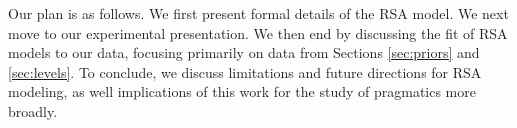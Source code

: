 Our plan is as follows. We first present formal details of the RSA model. We next move to our experimental presentation. We then end by discussing the fit of RSA models to our data, focusing primarily on data from Sections \ref{sec:priors} and \ref{sec:levels}. To conclude, we discuss limitations and future directions for RSA modeling, as well implications of this work for the study of pragmatics more broadly. 


